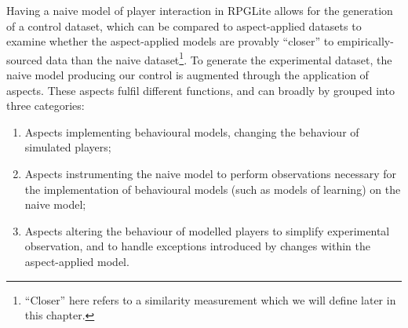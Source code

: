 



Having a naive model of player interaction in RPGLite allows for the generation
of a control dataset, which can be compared to aspect-applied datasets to
examine whether the aspect-applied models are provably ``closer'' to
empirically-sourced data than the naive dataset\footnote{``Closer'' here refers
to a similarity measurement which we will define later in this chapter.}. To
generate the experimental dataset, the naive model producing our control is
augmented through the application of aspects. These aspects fulfil different
functions, and can broadly by grouped into three categories:

\begin{enumerate}
  \item Aspects implementing behavioural models, changing the behaviour of
  simulated players;
  \item Aspects instrumenting the naive model to perform observations necessary
  for the implementation of behavioural models (such as models of learning) on
  the naive model;
  \item Aspects altering the behaviour of modelled players to simplify
  experimental observation, and to handle exceptions introduced by changes
  within the aspect-applied model.
\end{enumerate}

